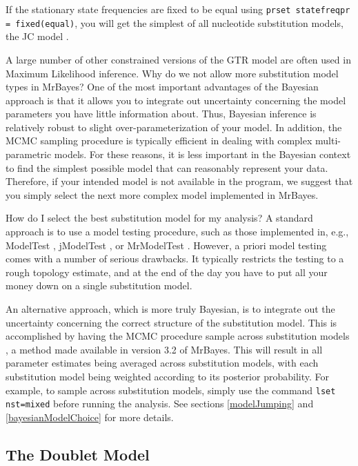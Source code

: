 \documentclass[12pt]{book}
\begin{document}
If the stationary state frequencies are fixed to be equal using \texttt{prset statefreqpr =
fixed(equal)}, you will get the simplest of all nucleotide substitution models, the JC model
\citep{jukes69}.

A large number of other constrained versions of the GTR model are often used in Maximum Likelihood
inference. Why do we not allow more substitution model types in MrBayes? One of the most important
advantages of the Bayesian approach is that it allows you to integrate out uncertainty concerning
the model parameters you have little information about. Thus, Bayesian inference is relatively
robust to slight over-parameterization of your model. In addition, the MCMC sampling procedure is
typically efficient in dealing with complex multi-parametric models. For these reasons, it is less
important in the Bayesian context to find the simplest possible model that can reasonably represent
your data. Therefore, if your intended model is not available in the program, we suggest that you
simply select the next more complex model implemented in MrBayes.

How do I select the best substitution model for my analysis? A standard approach is to use a model
testing procedure, such as those implemented in, e.g., ModelTest \citep{posada98}, jModelTest
\citep{posada08}, or MrModelTest \citep{nylander04b}. However, a priori model testing comes with a
number of serious drawbacks. It typically restricts the testing to a rough topology estimate, and
at the end of the day you have to put all your money down on a single substitution model.

An alternative approach, which is more truly Bayesian, is to integrate out the uncertainty
concerning the correct structure of the substitution model. This is accomplished by having the MCMC
procedure sample across substitution models \citep{huelsenbeck04d}, a method made available in
version 3.2 of MrBayes. This will result in all parameter estimates being averaged across
substitution models, with each substitution model being weighted according to its posterior
probability. For example, to sample across substitution models, simply use the command \texttt{lset
nst=mixed} before running the analysis. See sections \ref{modelJumping} and
\ref{bayesianModelChoice} for more details.

\subsection{The Doublet Model}
\end{document}
